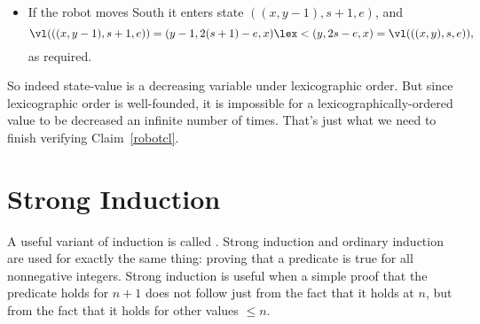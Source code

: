 \begin{editingnotes}
\begin{itemize}
\item If the robot moves South it enters state $((x,y-1),s+1,e)$, and
\[
\vl(((x,y-1),s+1,e)) = (y-1,2(s+1)-e,x) \lex< (y,2s-e,x) = \vl(((x,y),s,e)),
\]
as required.

\end{itemize}

So indeed state-value is a decreasing variable under lexicographic order.
But since lexicographic order is well-founded, it is impossible for a
lexicographically-ordered value to be decreased an infinite number of
times.  That's just what we need to finish verifying Claim~\ref{robotcl}.
\fi

\end{editingnotes}


\begin{problems}
\homeworkproblems








\classproblems








\end{problems}


\section{Strong Induction}\label{strong_ind_sec}

A useful variant of induction is called .  Strong
induction and ordinary induction are used for exactly the same thing:
proving that a predicate is true for all nonnegative integers.  Strong
induction is useful when a simple proof that the predicate holds for $n+1$
does not follow just from the fact that it holds at $n$, but from the fact
that it holds for other values $ \le n$.

